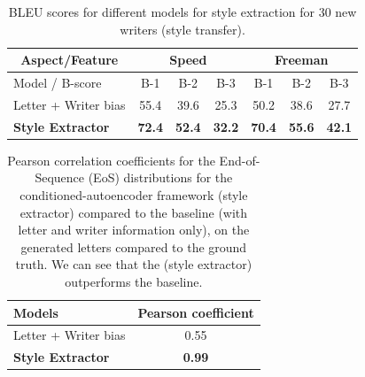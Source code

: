   \begin{table}[!htbp]
  \centering
  \begin{tabular}{l|c c c|c c c}
  \hline
  \multicolumn{1}{c|}{Aspect/Feature} & \multicolumn{3}{c|}{ Speed } & \multicolumn{3}{c}{ Freeman }   \\ \hline
  Model / B-score      & B-1  & B-2  & B-3           & B-1  & B-2   & B-3              \\ \hline
  Letter + Writer bias & 55.4 & 39.6 & 25.3 & 50.2 & 38.6 & 27.7             \\\hline
  \textbf{Style Extractor} & \textbf{72.4} & \textbf{52.4} & \textbf{32.2} & \textbf{70.4} & \textbf{55.6} & \textbf{42.1} \\\hline

  \end{tabular}
  \caption{BLEU scores for different models for style extraction for 30 new writers (style transfer).}
  \label{table:bleu_transfer}
  \end{table}


  \begin{table}[!htbp]
  \centering
  \begin{tabular}{l|c}
  \hline
  Models & Pearson coefficient\\ \hline
  Letter + Writer bias & 0.55\\ \hline
  \textbf{Style Extractor} & \textbf{0.99} \\ \hline
  \end{tabular}
  \caption{Pearson correlation coefficients for the End-of-Sequence (EoS) distributions for the conditioned-autoencoder framework (style extractor) compared to the baseline (with letter and writer information only), on the generated letters compared to the ground truth. We can see that the (style extractor) outperforms the baseline.}
  \label{table:EoS_gen}
  \end{table}

